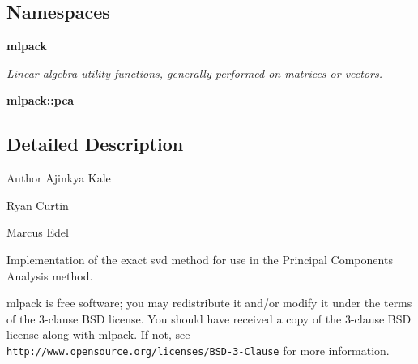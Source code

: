 \subsection*{Namespaces}
\begin{DoxyCompactItemize}
\item 
 \textbf{ mlpack}
\begin{DoxyCompactList}\small\item\em Linear algebra utility functions, generally performed on matrices or vectors. \end{DoxyCompactList}\item 
 \textbf{ mlpack\+::pca}
\end{DoxyCompactItemize}


\subsection{Detailed Description}
\begin{DoxyAuthor}{Author}
Ajinkya Kale 

Ryan Curtin 

Marcus Edel
\end{DoxyAuthor}
Implementation of the exact svd method for use in the Principal Components Analysis method.

mlpack is free software; you may redistribute it and/or modify it under the terms of the 3-\/clause B\+SD license. You should have received a copy of the 3-\/clause B\+SD license along with mlpack. If not, see {\tt http\+://www.\+opensource.\+org/licenses/\+B\+S\+D-\/3-\/\+Clause} for more information. 